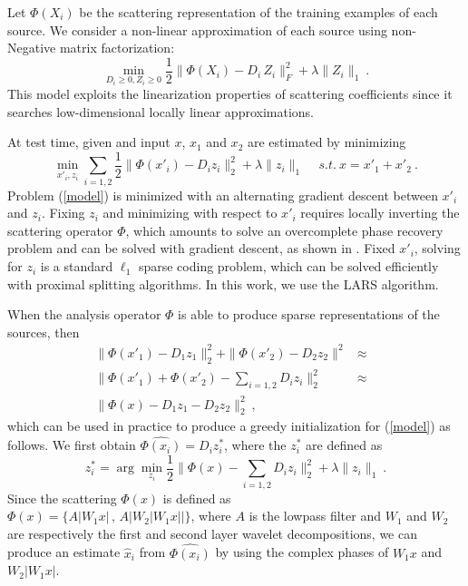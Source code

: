Let $\Phi(X_i)$ be the scattering representation of the training examples of each 
source. We consider a non-linear approximation of each source using non-Negative
matrix factorization:
\begin{equation}
\min_{D_i\geq 0, Z_i\geq 0} \frac{1}{2} \| \Phi(X_i) - D_i \, Z_i \|_F^2 + \lambda \| Z_i \|_1~.
\end{equation}
This model exploits the linearization properties of scattering coefficients since it 
searches low-dimensional locally linear approximations. 

At test time, given and input $x$, $x_1$ and $x_2$ are estimated by minimizing
\begin{equation}
\label{model}
\min_{x'_i, z_i} \sum_{i=1,2} \frac{1}{2} \| \Phi(x'_i) - D_i z_i \|_2^2 + \lambda \| z_i \|_1 \quad\,s.t. ~x=x'_1 + x'_2~.
\end{equation}
Problem (\ref{model}) is minimized with an alternating gradient descent between $x'_i$ and $z_i$. 
Fixing $z_i$ and minimizing with respect to $x'_i$ requires locally inverting the scattering 
operator $\Phi$, which amounts to solve an overcomplete phase recovery problem and 
can be solved with gradient descent, as shown in \cite{bruna2013audio}. 
Fixed $x'_i$, solving for $z_i$ is a standard $\ell_1$ sparse coding problem, which can be solved 
efficiently with proximal splitting algorithms. In this work, we use the LARS algorithm. 
 
When the analysis operator $\Phi$ is able to produce sparse representations of the sources, 
then 
\begin{eqnarray*}
\| \Phi(x'_1) - D_1 z_1 \|_2^2 + \| \Phi(x'_2) - D_2 z_2 \|^2 &\approx& \\
\| \Phi(x'_1) + \Phi(x'_2) - \sum_{i=1,2} D_i z_i \|_2^2 &\approx& \\
 \| \Phi(x) - D_1 z_1 - D_2 z_2 \|_2^2 ~,
\end{eqnarray*}
which can be used in practice to produce a greedy initialization for (\ref{model}) as follows. 
We first obtain $\widehat{\Phi(x_i)}= D_i z^*_i$, where the $z^*_i$ are defined as 
$$z^*_i = \arg\min_{z_i} \frac{1}{2}\| \Phi(x) - \sum_{i=1,2} D_i z_i \|_2^2 +\lambda \| z_i \|_1~.$$
Since the scattering $\Phi(x)$ is defined as \\$\Phi(x)= \{ A |W_1 x | \,,\, A | W_2 | W_1 x | | \}$, 
where $A$ is the lowpass filter and $W_1$ and $W_2$ are respectively the first and 
second layer wavelet decompositions, we can produce an estimate $\widehat{x}_i$ from 
$\widehat{\Phi(x_i)}$ by using the complex phases of $W_1 x$ and $W_2 |W_1 x|$.



